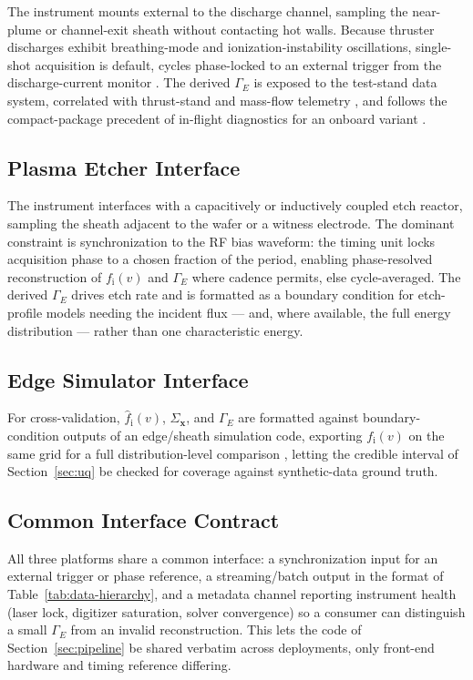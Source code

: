The instrument mounts external to the discharge channel, sampling the near-plume or channel-exit sheath without contacting hot walls. Because thruster discharges exhibit breathing-mode and ionization-instability oscillations, single-shot acquisition is default, cycles phase-locked to an external trigger from the discharge-current monitor \cite{ref0490}. The derived $\Gamma_{E}$ is exposed to the test-stand data system, correlated with thrust-stand and mass-flow telemetry \cite{ref0511}, and follows the compact-package precedent of in-flight diagnostics for an onboard variant \cite{ref0496}.

\subsection{Plasma Etcher Interface}

The instrument interfaces with a capacitively or inductively coupled etch reactor, sampling the sheath adjacent to the wafer or a witness electrode. The dominant constraint is synchronization to the RF bias waveform: the timing unit locks acquisition phase to a chosen fraction of the period, enabling phase-resolved reconstruction of $f_{\mathrm{i}}(v)$ and $\Gamma_{E}$ where cadence permits, else cycle-averaged. The derived $\Gamma_{E}$ drives etch rate and is formatted as a boundary condition for etch-profile models needing the incident flux — and, where available, the full energy distribution — rather than one characteristic energy.

\subsection{Edge Simulator Interface}

For cross-validation, $\hat f_{\mathrm{i}}(v)$, $\Sigma_{\mathbf{x}}$, and $\Gamma_{E}$ are formatted against boundary-condition outputs of an edge/sheath simulation code, exporting $f_{\mathrm{i}}(v)$ on the same grid for a full distribution-level comparison \cite{ref0712}, letting the credible interval of Section~\ref{sec:uq} be checked for coverage against synthetic-data ground truth.

\subsection{Common Interface Contract}

All three platforms share a common interface: a synchronization input for an external trigger or phase reference, a streaming/batch output in the format of Table~\ref{tab:data-hierarchy}, and a metadata channel reporting instrument health (laser lock, digitizer saturation, solver convergence) so a consumer can distinguish a small $\Gamma_{E}$ from an invalid reconstruction. This lets the code of Section~\ref{sec:pipeline} be shared verbatim across deployments, only front-end hardware and timing reference differing.

